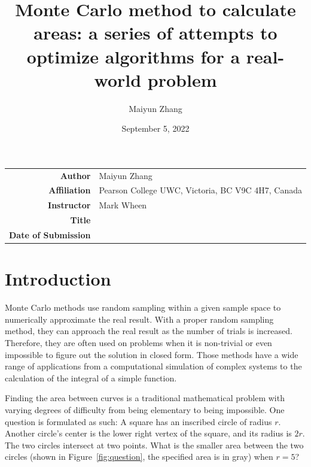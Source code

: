\documentclass[a4paper]{article}
\title{Monte Carlo method to calculate areas: a series of attempts to optimize algorithms for a real-world problem}
\author{Maiyun Zhang}
\date{September 5, 2022}
\renewcommand\maketitlehookd{
    \mbox{}\medskip\par
    \centering
    \begin{minipage}{0.8\textwidth}
        \begin{abstract}
            This essay presents a Monte Carlo-based method to calculate the area of a shape and several attempts to refine and optimize the algorithm. Through
            analyses based on the nature of the computational hardware and the algorithms, we are able to reduce the run time of the na\"\i{}ve method by more than 80 percent while still converging to the correct result.
            the nature of the computational hardware.
        \end{abstract}
        {\small\textit{Keywords:} Monte Carlo, optimization, integration}
    \end{minipage}
}
\begin{document}
\begin{titlepage}
    \LARGE
    \vspace*{\fill}
    \renewcommand{\arraystretch}{2}
    \centering
    \begin{tabular}{r@{:\,}p{}}
    \textbf{Author} & Maiyun Zhang\\
    \textbf{Affiliation} & Pearson College UWC, Victoria, BC V9C 4H7, Canada\\
    \textbf{Instructor} & Mark Wheen\\
    \textbf{Title} & \makeatletter{}\@title{}\makeatother{}\\
    \textbf{Date of Submission} & \makeatletter{}\@date{}\makeatother{}
    \end{tabular}
    \vspace*{\fill}
\end{titlepage}
\begin{titlepage}
    \maketitle
    \tableofcontents
\end{titlepage}

\section{Introduction}
Monte Carlo methods use random sampling within a given sample space to numerically approximate the real result. With a proper random sampling method, they can approach the real result as the number of trials is increased. Therefore, they are often used on problems when it is non-trivial or even impossible to figure out the solution in closed form. Those methods have a wide range of applications from a computational simulation of complex systems to the calculation of the integral of a simple function.

Finding the area between curves is a traditional mathematical problem with varying degrees of difficulty from being elementary to being impossible. One question is formulated as such: A square has an inscribed circle of radius \(r\). Another circle's center is the lower right vertex of the square, and its radius is \(2r\). The two circles intersect at two points. What is the smaller area between the two circles (shown in Figure~\ref{fig:question}, the specified area is in gray) when \(r = 5\)?
\end{document}
